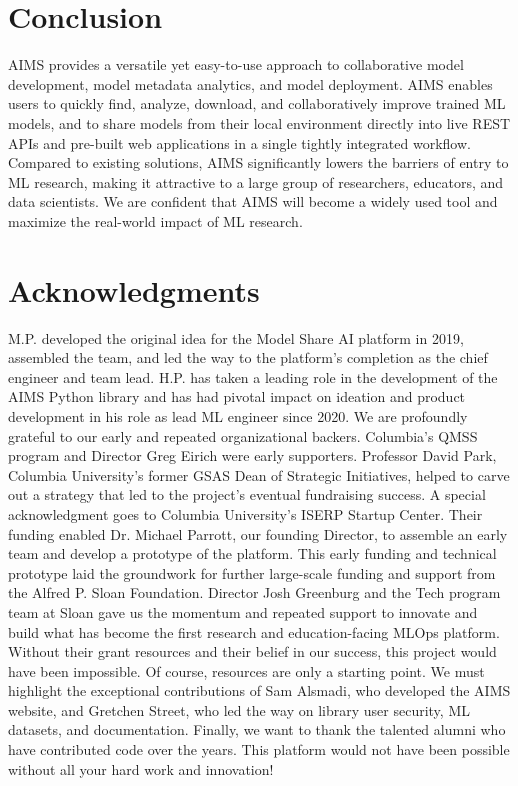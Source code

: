 \section{Conclusion}
AIMS provides a versatile yet easy-to-use approach to collaborative model development, model metadata analytics, and model deployment. AIMS enables users to quickly find, analyze, download, and collaboratively improve trained ML models, and to share models from their local environment directly into live REST APIs and pre-built web applications in a single tightly integrated workflow. Compared to existing solutions, AIMS significantly lowers the barriers of entry to ML research, making it attractive to a large group of researchers, educators, and data scientists. We are confident that AIMS will become a widely used tool and maximize the real-world impact of ML research.

\newpage
\section*{Acknowledgments}
M.P. developed the original idea for the Model Share AI platform in 2019, assembled the team, and led the way to the platform's completion as the chief engineer and team lead. H.P. has taken a leading role in the development of the AIMS Python library and has had pivotal impact on ideation and product development in his role as lead ML engineer since 2020. We are profoundly grateful to our early and repeated organizational backers. Columbia’s QMSS program and Director Greg Eirich were early supporters. Professor David Park, Columbia University’s former GSAS Dean of Strategic Initiatives, helped to carve out a strategy that led to the project’s eventual fundraising success. A special acknowledgment goes to Columbia University's ISERP Startup Center. Their funding enabled Dr. Michael Parrott, our founding Director, to assemble an early team and develop a prototype of the platform. This early funding and technical prototype laid the groundwork for further large-scale funding and support from the Alfred P. Sloan Foundation. Director Josh Greenburg and the Tech program team at Sloan gave us the momentum and repeated support to innovate and build what has become the first research and education-facing MLOps platform. Without their grant resources and their belief in our success, this project would have been impossible. Of course, resources are only a starting point. We must highlight the exceptional contributions of Sam Alsmadi, who developed the AIMS website, and Gretchen Street, who led the way on library user security, ML datasets, and documentation. Finally, we want to thank the talented alumni who have contributed code over the years. This platform would not have been possible without all your hard work and innovation!
